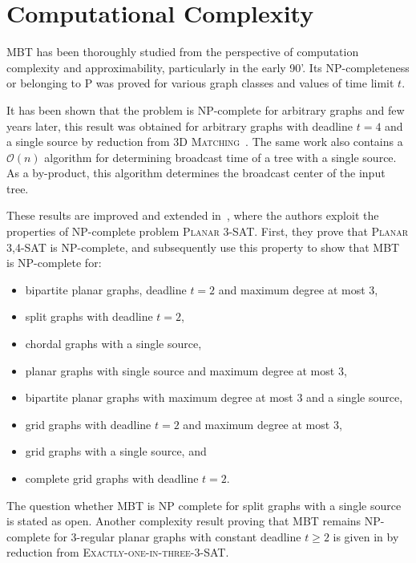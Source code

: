 
\section{Computational Complexity}

MBT has been thoroughly studied from the perspective of computation complexity and approximability, particularly in the early 90'.
Its NP-completeness or belonging to P was proved for various graph classes and values of time limit $t$.

It has been shown that the problem is NP-complete for arbitrary graphs \cite{garey79} and few years later, 
this result was obtained for arbitrary graphs with deadline $t=4$ and a single source by reduction from \textsc{3D Matching}~\cite{slater81}. 
The same work also contains a $\mathcal{O}(n)$ algorithm for determining broadcast time of a tree with a single source. 
As a by-product, this algorithm determines the broadcast center of the input tree.

These results are improved and extended in~\cite{jansen95}, where the authors exploit the properties of NP-complete problem \textsc{Planar 3-SAT}.
First, they prove that \textsc{Planar 3,4-SAT} is NP-complete, and subsequently use this property to show that MBT is NP-complete for:
\begin{itemize}
\item bipartite planar graphs, deadline $t=2$ and maximum degree at most 3,
\item split graphs with deadline $t=2$,
\item chordal graphs with a single source, 
\item planar graphs with single source and maximum degree at most 3, 
\item bipartite planar graphs with maximum degree at most 3 and a single source,
\item grid graphs with deadline $t=2$ and maximum degree at most 3,
\item grid graphs with a single source, and
\item complete grid graphs with deadline $t=2$. 
\end{itemize}
The question whether MBT is NP complete for split graphs with a single source is stated as open.
Another complexity result proving that MBT remains NP-complete for 3-regular planar graphs with constant deadline $t\geq 2$ 
is given in \cite{middendorf93} by reduction from \textsc{Exactly-one-in-three-3-SAT}.

